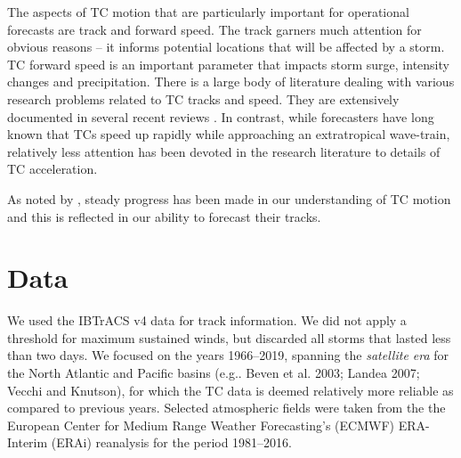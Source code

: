 \documentclass[wcd,manuscript]{copernicus}
\begin{document}
% 

The aspects of TC motion that are particularly important for operational forecasts are track and forward speed. The track garners much attention for obvious reasons -- it  informs  potential locations that will be affected by a storm. TC forward speed is an important parameter that impacts storm surge, intensity changes and precipitation. There is a large body of literature dealing with various research problems related to TC tracks and speed. They are extensively documented in several recent reviews \citep[e.g.,][]{E2018,other}. In contrast, while forecasters have long known that TCs speed up rapidly while approaching an extratropical wave-train, relatively less attention has been devoted in the research literature to details of TC acceleration. 





As noted by \cite{E2018}, steady progress has been made in our understanding of TC motion and this is reflected in our ability to forecast their tracks.






\section{Data}
We used the IBTrACS v4 \citep{KnappIBTRaCS} data for track information. We did not apply a threshold for maximum sustained winds, but discarded all storms that lasted less than two days.  We focused on the years 1966--2019, spanning the \emph{satellite era} for the North Atlantic and Pacific basins (e.g.. Beven et al. 2003; Landea 2007; Vecchi and Knutson), for which the TC data is deemed relatively more reliable as compared to previous years. Selected atmospheric fields were taken from the the European Center for Medium Range Weather Forecasting's (ECMWF) ERA-Interim (ERAi) reanalysis \citep{DUS11} for the period 1981--2016.
\end{document}
